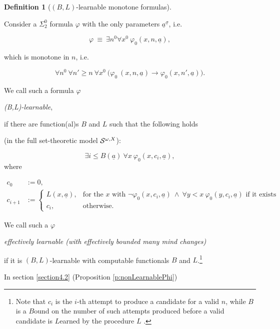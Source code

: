 \documentclass[1p]{elsarticle}
\newcommand{\tup}{\underline} %
\newcommand{\Telse}{\text{otherwise}}
\theoremstyle{plain}
\theoremstyle{definition}
\newtheorem{dfn}[thm]{Definition}
\theoremstyle{remark}
\renewcommand{\phi}{\varphi}
\theoremstyle{definition}
\begin{document}
\begin{dfn}[$(B,L)$-learnable monotone formulas]\label{d:fmcMon}

Consider a $\Sigma^0_2$ formula $\phi$ with the only parameters $\tup a^{\tup \sigma}$, i.e.

\[\phi\ \equiv\ \exists n^0 \forall x^0\ \phi_0(x,n,\tup a),\]

which is monotone in $n$, i.e.

\[ 

\forall n^0\ \forall n'\ge n\ \forall x^0\ \big(  \phi_0\ (x,n,\tup a) \rightarrow  \phi_0(x,n',\tup a) \big).

\]

We call such a formula $\phi$ 

{\em (B,L)-learnable},

if there are function(al)s $B$ and $L$ such that the following holds 

(in the full set-theoretic model ${\cal S}^{\omega,X}$):

\[ 

\exists i\leq B(\tup a)\ \forall x\ \phi_0(x,c_i,\tup a),\] where

\begin{align*}

c_0&:=0,\\

c_{i+1}&:=

\begin{cases}

L(x, \tup a),&\text{for the $x$ with } \neg\phi_0(x,c_i,\tup a)\ \wedge\ \forall y<x\ \phi_0(y,c_i,\tup a) \text{ if it exists}\\

c_i,&\Telse.

\end{cases}

\end{align*}

We call such a $\phi$ 

{\em effectively learnable (with effectively bounded many mind changes)} 

if it is $(B,L)$-learnable with computable functionals $B$ and $L$.\footnote{Note that $c_i$ is the $i$-th attempt to produce a $c$andidate for a valid $n$, while $B$ is a $B$ound on the number of such attempts produced before a valid candidate is $L$earned by the procedure $L$ .}

\end{dfn}

In section \ref{section4.2} (Proposition \ref{p:nonLearnablePhi}) 
\end{document}
